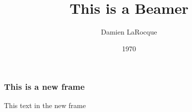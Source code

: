 \documentclass{beamer}
\title{This is a Beamer}
\author{Damien LaRocque}
\institute{Institute FooBar}
\date{1970}
\begin{document}
\frame{\titlepage}

\begin{frame}

    \frametitle{This is a new frame}

    This text in the new frame

\end{frame}

\begin{frame}


\end{frame}
\end{document}
